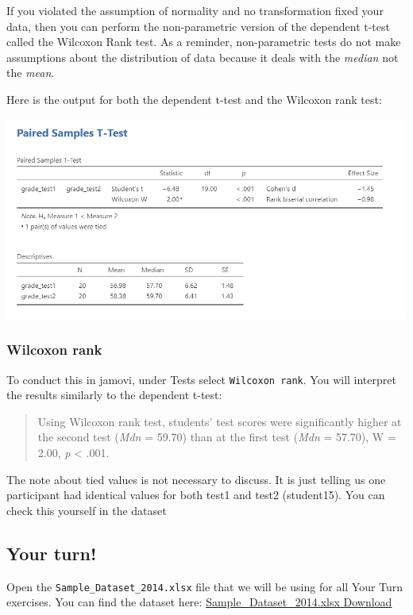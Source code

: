 \documentclass[
]{book}
\begin{document}
If you violated the assumption of normality and no transformation fixed your data, then you can perform the non-parametric version of the dependent t-test called the Wilcoxon Rank test. As a reminder, non-parametric tests do not make assumptions about the distribution of data because it deals with the \emph{median} not the \emph{mean}.

Here is the output for both the dependent t-test and the Wilcoxon rank test:

\includegraphics{images/03_dependent_t-test/dependent_results_full.png}

\hypertarget{wilcoxon-rank}{%
\subsubsection{Wilcoxon rank}\label{wilcoxon-rank}}

To conduct this in jamovi, under Tests select \texttt{Wilcoxon\ rank}. You will interpret the results similarly to the dependent t-test:

\begin{quote}
Using Wilcoxon rank test, students' test scores were significantly higher at the second test (\emph{Mdn} = 59.70) than at the first test (\emph{Mdn} = 57.70), W = 2.00, \emph{p} \textless{} .001.
\end{quote}

The note about tied values is not necessary to discuss. It is just telling us one participant had identical values for both test1 and test2 (student15). You can check this yourself in the dataset

\hypertarget{your-turn-2}{%
\subsection{Your turn!}\label{your-turn-2}}

Open the \texttt{Sample\_Dataset\_2014.xlsx} file that we will be using for all Your Turn exercises. You can find the dataset here: \href{https://github.com/danawanzer/stats-with-jamovi/blob/master/data/Sample_Dataset_2014.xlsx}{Sample\_Dataset\_2014.xlsx Download}
\end{document}
